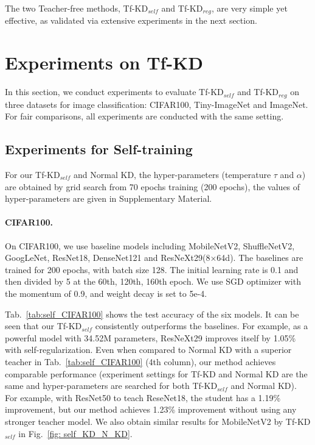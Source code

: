 \documentclass[10pt,twocolumn,letterpaper]{article}
\begin{document}
The two Teacher-free methods, Tf-KD$_{self}$ and Tf-KD$_{reg}$, are very simple yet effective, as validated via extensive experiments in the next section.

\section{Experiments on Tf-KD}
In this section, we conduct experiments to evaluate Tf-KD$_{self}$ and Tf-KD$_{reg}$ on three datasets for image classification:  CIFAR100, Tiny-ImageNet and ImageNet. For fair comparisons, all experiments are conducted with the same setting.
\vspace{-4pt}
\subsection{Experiments for Self-training}
For our Tf-KD$_{self}$ and Normal KD, the hyper-parameters (temperature $\tau$ and $\alpha$) are obtained by grid search from 70 epochs training (200 epochs), the values of hyper-parameters are given in Supplementary Material.
\vspace{-7pt}
\paragraph{CIFAR100.} On CIFAR100, we use baseline models including MobileNetV2, ShuffleNetV2, GoogLeNet,
ResNet18, DenseNet121 and ResNeXt29(8$\times$64d). The baselines are trained for 200 epochs, with batch size 128. The initial learning rate is 0.1 and then divided by 5 at the 60th, 120th, 160th epoch. We use SGD optimizer with the momentum of 0.9, and weight decay is set to 5e-4. 

Tab.~\ref{tab:self_CIFAR100} shows the test accuracy of the six models. It can be seen that our Tf-KD$_{self}$ consistently outperforms the baselines. For example, as a powerful model with 34.52M parameters, ResNeXt29 improves itself by 1.05\% with self-regularization. Even when compared to Normal KD with a superior teacher in Tab.~\ref{tab:self_CIFAR100} (4th column), our method achieves comparable performance (experiment settings for Tf-KD and Normal KD are the same and hyper-parameters are searched for both Tf-KD$_{self}$ and Normal KD). For example, with ResNet50 to teach ReseNet18, the student has a 1.19\% improvement, but our method achieves 1.23\% improvement without using any stronger teacher model. We also obtain similar results for MobileNetV2 by Tf-KD$_{self}$ in Fig.~\ref{fig: self_KD_N_KD}.
\vspace{-10pt}
\end{document}
